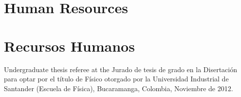 \ifeng
\section*{Human Resources}
\else
\section*{Recursos Humanos}
\fi

\ifeng
Undergraduate thesis referee at the
\else
Jurado de tesis de grado en la 
\fi
Disertación para optar por el título de Físico otorgado por la Universidad Industrial de Santander (Escuela de Física), Bucaramanga, Colombia, Noviembre de 2012.
